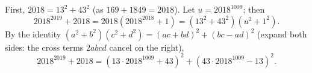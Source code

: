 First, $2018=13^2+43^2$ (as $169+1849=2018$). Let $u=2018^{1009}$; then
\[
2018^{2019}+2018=2018\left(2018^{2018}+1\right)=\left(13^2+43^2\right)\left(u^2+1^2\right).
\]
By the identity $\left(a^2+b^2\right)\left(c^2+d^2\right)=(ac+bd)^2+(bc-ad)^2$ (expand both sides: the cross terms $2abcd$ cancel on the right),
\[
2018^{2019}+2018=\boxed{\left(13\cdot2018^{1009}+43\right)^2+\left(43\cdot2018^{1009}-13\right)^2}.
\]
